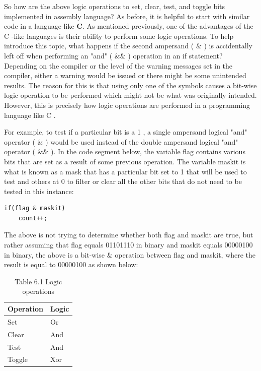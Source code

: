 \documentclass[10pt]{book}
\begin{document}
So how are the above logic operations to set, clear, test, and toggle bits implemented in assembly language? As before, it is helpful to start with similar code in a language like $\mathbf{C}$. As mentioned previously, one of the advantages of the C -like languages is their ability to perform some logic operations. To help introduce this topic, what happens if the second ampersand ( $\&$ ) is accidentally left off when performing an "and" ( $\& \&$ ) operation in an if statement? Depending on the compiler or the level of the warning messages set in the compiler, either a warning would be issued or there might be some unintended results. The reason for this is that using only one of the symbols causes a bit-wise logic operation to be performed which might not be what was originally intended. However, this is precisely how logic operations are performed in a programming language like C .

For example, to test if a particular bit is a 1 , a single ampersand logical "and" operator ( $\&$ ) would be used instead of the double ampersand logical "and" operator ( $\& \&$ ). In the code segment below, the variable flag contains various bits that are set as a result of some previous operation. The variable maskit is what is known as a mask that has a particular bit set to 1 that will be used to test and others at 0 to filter or clear all the other bits that do not need to be tested in this instance:

\begin{verbatim}
if(flag & maskit)
    count++;
\end{verbatim}

The above is not trying to determine whether both flag and maskit are true, but rather assuming that flag equals 01101110 in binary and maskit equals 00000100 in binary, the above is a bit-wise \& operation between flag and maskit, where the result is equal to 00000100 as shown below:

\begin{table}[htbp]
\begin{center}
\captionsetup{labelformat=empty}
\caption{Table 6.1 Logic operations}
\begin{tabular}{|ll|}
\hline
Operation & Logic \\
\hline
Set & Or \\
Clear & And \\
Test & And \\
Toggle & Xor \\
\hline
\end{tabular}
\end{center}
\end{table}
\end{document}
